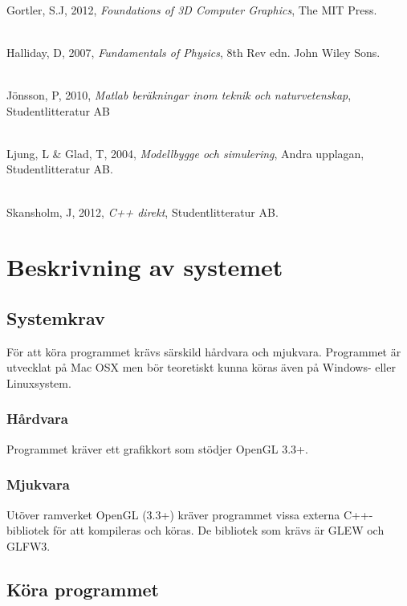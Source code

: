 \documentclass[a4paper,12pt,oneside,final,swedish]{extarticle}
\begin{document}
\noindent \\Gortler, S.J, 2012, \textit{Foundations of 3D Computer Graphics}, The MIT Press.

\noindent \\Halliday, D, 2007, \textit{Fundamentals of Physics}, 8th Rev edn. John Wiley Sons.

\noindent \\Jönsson, P, 2010, \textit{Matlab beräkningar inom teknik och naturvetenskap}, Studentlitteratur AB

\noindent \\Ljung, L \& Glad, T, 2004, \textit{Modellbygge och simulering}, Andra upplagan, Studentlitteratur AB.

\noindent \\Skansholm, J, 2012, \textit{C++ direkt}, Studentlitteratur AB.




\appendix

\section{Beskrivning av systemet}
\subsection{Systemkrav}
För att köra programmet krävs särskild hårdvara och mjukvara. Programmet är utvecklat på Mac OSX men bör teoretiskt kunna köras även på Windows- eller Linuxsystem.
\subsubsection{Hårdvara}
Programmet kräver ett grafikkort som stödjer OpenGL 3.3+.
\subsubsection{Mjukvara}
Utöver ramverket OpenGL (3.3+) kräver programmet vissa externa C++-bibliotek för att kompileras och köras. De bibliotek som krävs är GLEW och GLFW3.
\subsection{Köra programmet}
\end{document}
